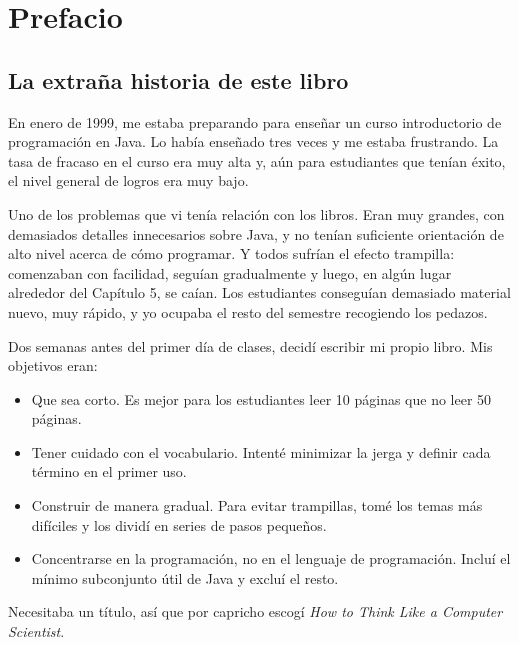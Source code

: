 \documentclass[10pt]{book}
\begin{document}
\fi


\chapter{Prefacio}

\section*{La extraña historia de este libro}

En enero de 1999, me estaba preparando para enseñar un curso introductorio
de programación en Java.  Lo había enseñado tres veces y me estaba frustrando.
La tasa de fracaso en el curso era muy alta y, aún para estudiantes que
tenían éxito, el nivel general de logros era muy bajo.

Uno de los problemas que vi tenía relación con los libros.
Eran muy grandes, con demasiados detalles innecesarios sobre Java, y
no tenían suficiente orientación de alto nivel acerca de cómo programar.  Y todos
sufrían el efecto trampilla: comenzaban con facilidad,
seguían gradualmente y luego, en algún lugar alrededor del Capítulo 5,
se caían.  Los estudiantes conseguían demasiado material nuevo,
muy rápido, y yo ocupaba el resto del semestre recogiendo los pedazos.

Dos semanas antes del primer día de clases, decidí escribir mi propio libro.
Mis objetivos eran:

\begin{itemize}

\item Que sea corto.  Es mejor para los estudiantes leer 10 páginas que
no leer 50 páginas.

\item Tener cuidado con el vocabulario.  Intenté minimizar la jerga y
definir cada término en el primer uso.

\item Construir de manera gradual. Para evitar trampillas, tomé los temas más difíciles
y los dividí en series de pasos pequeños.

\item Concentrarse en la programación, no en el lenguaje de programación.  Incluí
el mínimo subconjunto útil de Java y excluí el resto.

\end{itemize}

Necesitaba un título, así que por capricho escogí {\em How to Think Like
a Computer Scientist}.
\end{document}

